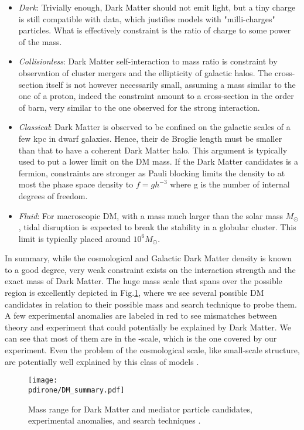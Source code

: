 \begin{itemize}
\item \textit{Dark}: Trivially enough, Dark Matter should not emit light, but a tiny charge is still compatible with data, which justifies models with "milli-charges" particles. What is effectively constraint is the ratio of charge to some power of the mass.
\item \textit{Collisionless}: Dark Matter self-interaction to mass ratio is constraint by observation of cluster mergers and the ellipticity of galactic halos. The cross-section itself is not however necessarily small, assuming a mass similar to the one of a proton, indeed the constraint amount to a cross-section in the order of barn, very similar to the one observed for the strong interaction.
\item \textit{Classical}: Dark Matter is observed to be confined on the galactic scales of a few kpc in dwarf galaxies. Hence, their de Broglie length must be smaller than that to have a coherent Dark Matter halo. This argument is typically used to put a lower limit on the DM mass. If the Dark Matter candidates is a fermion, constraints are stronger as Pauli blocking limits the density to at most the phase space density to $f=gh^{-3}$ where g is the number of internal degrees of freedom.
\item \textit{Fluid}: For macroscopic DM, with a mass much larger than the solar mass $M_{\odot}$, tidal disruption is expected to break the stability in a globular cluster. This limit is typically placed around $10^6 M_{\odot}$.
\end{itemize}

In summary, while the cosmological and Galactic Dark Matter density is known to a good degree, very weak constraint exists on the interaction strength and the exact mass of Dark Matter. The huge mass scale that spans over the possible region is excellently depicted in Fig.\ref{fig:dm-mass-range}, where we see several possible DM candidates in relation to their possible mass and search technique to probe them. A few experimental anomalies are labeled in red to see mismatches between theory and experiment that could potentially be explained by Dark Matter. We can see that most of them are in the \mev-\gev scale, which is the one covered by our experiment. Even the problem of the cosmological scale, like small-scale structure, are potentially well explained by this class of models \cite{battaglieri2017cosmic}.

\begin{figure}[bht!]
  \centering
  \texttt{[image: \\pdirone/DM\_summary.pdf]}
  \caption[Mass range for Dark Matter]{Mass range for Dark Matter and mediator particle candidates, experimental anomalies, and search techniques \cite{battaglieri2017cosmic}.}
  \label{fig:dm-mass-range}
\end{figure}

